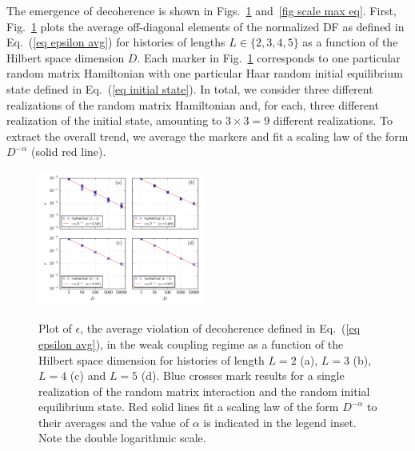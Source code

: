 \documentclass[pre,twocolumn,10pt,aps,longbibliography,nofootinbib]{revtex4-1}
\newcommand{\new}[1]{#1}
\begin{document}
The emergence of \new{decoherence} is shown in Figs.~\ref{fig scale avg eq} and~\ref{fig scale max eq}. First,
Fig.~\ref{fig scale avg eq} plots the average off-diagonal elements of the normalized DF as defined in
Eq.~(\ref{eq epsilon avg}) for histories of lengths $L\in\{2,3,4,5\}$ as a function of the Hilbert space dimension $D$.
Each marker in Fig.~\ref{fig scale avg eq} corresponds to one particular random matrix Hamiltonian with one particular
Haar random initial equilibrium state defined in Eq.~(\ref{eq initial state}). In total, we consider three different
realizations of the random matrix Hamiltonian and, for each, three different realization of the initial state, amounting
to $3\times3=9$ different realizations. To extract the overall trend, we average the markers and fit a scaling law of the
form $D^{-\alpha}$ (solid red line).

\begin{figure}[t]
 \centering\includegraphics[width=0.49\textwidth,clip=true]{eps_001_eq.pdf}
 \label{fig scale avg eq}\vspace{-0.5cm}
 \caption{Plot of $\epsilon$, the average violation of decoherence defined in Eq.~(\ref{eq epsilon avg}), in the weak coupling regime as a function of the Hilbert space dimension for histories of length $L=2$ (a), $L=3$ (b), $L=4$ (c) and $L=5$ (d). Blue crosses mark results for a single realization of the random matrix interaction and the random initial equilibrium state. Red solid lines fit a scaling law of the form $D^{-\alpha}$ to their averages and the value of $\alpha$ is indicated in the legend inset. Note the double logarithmic scale. }
\end{figure}
\end{document}
